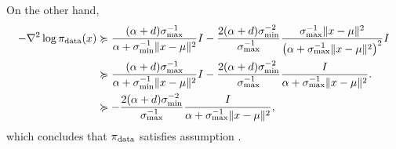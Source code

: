 On the other hand,
\begin{align*}
    -\nabla^2\log\operatorname*{\pi_{\text{data}}}(x)&\succcurlyeq \frac{(\alpha + d)\sigma_{\max}^{-1}}{\alpha + {\sigma_{\min}^{-1}} \Vert x-\mu\Vert^2} I -\frac{2(\alpha + d)\sigma_{\min}^{-2}}{\sigma_{\max}^{-1}}\frac{\sigma_{\max}^{-1} \Vert x-\mu\Vert^2}{\left({\alpha + {\sigma_{\max}^{-1}} \Vert x-\mu\Vert^2}\right)^2} I\\
    &\succcurlyeq \frac{(\alpha + d)\sigma_{\max}^{-1}}{\alpha + {\sigma_{\min}^{-1}} \Vert x-\mu\Vert^2} I -\frac{2(\alpha + d)\sigma_{\min}^{-2}}{\sigma_{\max}^{-1}}\frac{I}{{\alpha + {\sigma_{\max}^{-1}} \Vert x-\mu\Vert^2}}.\\
    &\succcurlyeq -\frac{2(\alpha + d)\sigma_{\min}^{-2}}{\sigma_{\max}^{-1}}\frac{I}{{\alpha + {\sigma_{\max}^{-1}} \Vert x-\mu\Vert^2}},
\end{align*}
which concludes that $\operatorname*{\pi_{\text{data}}}$ satisfies assumption .